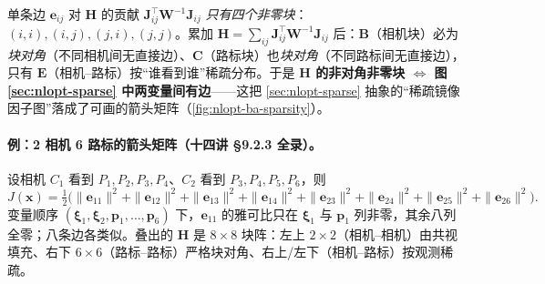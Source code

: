 \begin{insight}[$\mathbf{H}$ 的稀疏 $=$ 因子图的邻接]
单条边 $\mathbf{e}_{ij}$ 对 $\mathbf{H}$ 的贡献 $\mathbf{J}_{ij}^\top\mathbf{W}^{-1}\mathbf{J}_{ij}$ \emph{只有四个非零块}：$(i,i),(i,j),(j,i),(j,j)$。累加 $\mathbf{H}=\sum_{ij}\mathbf{J}_{ij}^\top\mathbf{W}^{-1}\mathbf{J}_{ij}$ 后：$\mathbf{B}$（相机块）必为\emph{块对角}（不同相机间无直接边）、$\mathbf{C}$（路标块）也\emph{块对角}（不同路标间无直接边），只有 $\mathbf{E}$（相机--路标）按“谁看到谁”稀疏分布。于是 \textbf{$\mathbf{H}$ 的非对角非零块 $\iff$ 图 \cref{sec:nlopt-sparse} 中两变量间有边}——这把 \cref{sec:nlopt-sparse} 抽象的“稀疏镜像因子图”落成了可画的箭头矩阵（\cref{fig:nlopt-ba-sparsity}）。
\end{insight}

\paragraph{例：2 相机 6 路标的箭头矩阵（十四讲 §9.2.3 全录）。}\cite{gaoxiang2019slam14}
设相机 $C_1$ 看到 $P_1,P_2,P_3,P_4$、$C_2$ 看到 $P_3,P_4,P_5,P_6$，则
\begin{equation}
  J(\mathbf{x})=\tfrac12\big(\|\mathbf{e}_{11}\|^2+\|\mathbf{e}_{12}\|^2+\|\mathbf{e}_{13}\|^2+\|\mathbf{e}_{14}\|^2+\|\mathbf{e}_{23}\|^2+\|\mathbf{e}_{24}\|^2+\|\mathbf{e}_{25}\|^2+\|\mathbf{e}_{26}\|^2\big).
  \label{eq:nlopt-ba-26}
\end{equation}
变量顺序 $(\boldsymbol{\xi}_1,\boldsymbol{\xi}_2,\mathbf{p}_1,\dots,\mathbf{p}_6)$ 下，$\mathbf{e}_{11}$ 的雅可比只在 $\boldsymbol{\xi}_1$ 与 $\mathbf{p}_1$ 列非零，其余八列全零；八条边各类似。叠出的 $\mathbf{H}$ 是 $8\times8$ 块阵：左上 $2\times2$（相机--相机）由共视填充、右下 $6\times6$（路标--路标）严格块对角、右上/左下（相机--路标）按观测稀疏。

